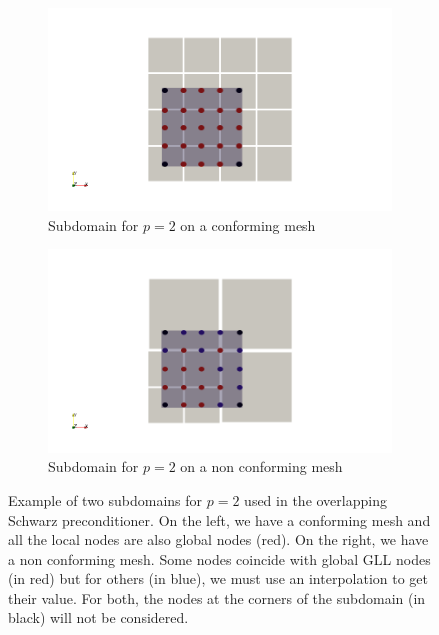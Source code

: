 \begin{figure}
\centering
\begin{subfigure}{.5\textwidth}
  \centering
  \includegraphics[width=1.2\linewidth]{Theory/fine_over_1.png}
  \caption{Subdomain for $p=2$ on a conforming mesh}
  \label{fine_over_1}
\end{subfigure}%
\begin{subfigure}{.5\textwidth}
  \centering
  \includegraphics[width=1.2\linewidth]{Theory/fine_over_2.png}
  \caption{Subdomain for $p=2$ on a non conforming mesh}
  \label{fine_over_2}
\end{subfigure}
\caption{Example of two subdomains for $p=2$ used in the overlapping Schwarz preconditioner. On the left, we have a conforming mesh and all the local nodes are also global nodes (red). On the right, we have a non conforming mesh. Some nodes coincide with global GLL nodes (in red) but for others (in blue), we must use an interpolation to get their value. For both, the nodes at the corners of the subdomain (in black) will not be considered.}
\label{fine_over}
\end{figure}

